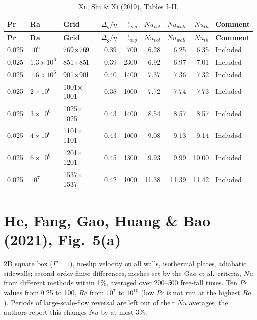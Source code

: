 \documentclass[11pt]{article}
\begin{document}
\begin{longtable}{l l l r r r r r l}
\caption{Xu, Shi \& Xi (2019), Tables I--II.}\label{tab:xu2019}\\
\toprule
\textbf{Pr} & \textbf{Ra} & \textbf{Grid} & $\Delta_g/\eta$ & $t_{avg}$ & $Nu_{vol}$ & $Nu_{wall}$ & $Nu_{th}$ & \textbf{Comment} \\
\midrule
\endfirsthead
\toprule
\textbf{Pr} & \textbf{Ra} & \textbf{Grid} & $\Delta_g/\eta$ & $t_{avg}$ & $Nu_{vol}$ & $Nu_{wall}$ & $Nu_{th}$ & \textbf{Comment} \\
\midrule
\endhead
\bottomrule
\endfoot
\rowcolor{included} 0.025 & $10^{6}$ & 769$\times$769 & 0.39 & 700 & 6.28 & 6.25 & 6.35 & Included \\
\rowcolor{included} 0.025 & $1.3\times10^{6}$ & 851$\times$851 & 0.39 & 2300 & 6.92 & 6.97 & 7.01 & Included \\
\rowcolor{included} 0.025 & $1.6\times10^{6}$ & 901$\times$901 & 0.40 & 1400 & 7.37 & 7.36 & 7.32 & Included \\
\rowcolor{included} 0.025 & $2\times10^{6}$ & 1001$\times$1001 & 0.38 & 1000 & 7.72 & 7.74 & 7.73 & Included \\
\rowcolor{included} 0.025 & $3\times10^{6}$ & 1025$\times$1025 & 0.43 & 1400 & 8.54 & 8.57 & 8.57 & Included \\
\rowcolor{included} 0.025 & $4\times10^{6}$ & 1101$\times$1101 & 0.43 & 1000 & 9.08 & 9.13 & 9.14 & Included \\
\rowcolor{included} 0.025 & $6\times10^{6}$ & 1201$\times$1201 & 0.45 & 1300 & 9.93 & 9.99 & 10.00 & Included \\
\rowcolor{included} 0.025 & $10^{7}$ & 1537$\times$1537 & 0.42 & 1000 & 11.38 & 11.39 & 11.42 & Included \\
\end{longtable}

\section{He, Fang, Gao, Huang \& Bao (2021), Fig.~5(a)}\label{sec:he2021}
2D square box ($\Gamma=1$), no-slip velocity on all walls, isothermal
plates, adiabatic sidewalls; second-order finite differences, meshes set by
the Gao et al.\ criteria, $Nu$ from different methods within 1\%, averaged
over 200--500 free-fall times. Ten $Pr$ values from 0.25 to 100, $Ra$ from
$10^7$ to $10^{10}$ (low $Pr$ is not run at the highest $Ra$). Periods of
large-scale-flow reversal are left out of their $Nu$ averages; the authors
report this changes $Nu$ by at most 3\%.
\end{document}
